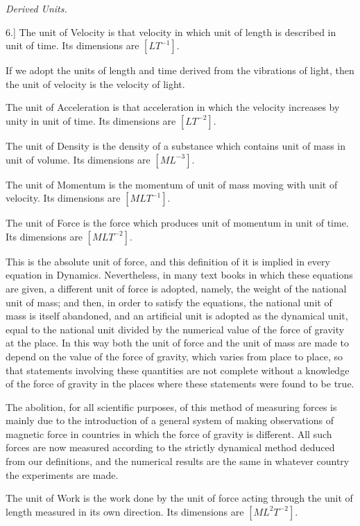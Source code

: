 \documentclass[11pt,a4paper]{article}
\begin{document}
\clearpage

\begin{center}
\textit{Derived Units.}
\end{center}

6.] The unit of Velocity is that velocity in which unit of length is
described in unit of time. Its dimensions are \([LT^{-1}]\).

If we adopt the units of length and time derived from the vibrations of
light, then the unit of velocity is the velocity of light.

The unit of Acceleration is that acceleration in which the velocity
increases by unity in unit of time. Its dimensions are \([LT^{-2}]\).

The unit of Density is the density of a substance which contains unit of
mass in unit of volume. Its dimensions are \([ML^{-3}]\).

The unit of Momentum is the momentum of unit of mass moving with unit of
velocity. Its dimensions are \([MLT^{-1}]\).

The unit of Force is the force which produces unit of momentum in unit of
time. Its dimensions are \([MLT^{-2}]\).

This is the absolute unit of force, and this definition of it is implied
in every equation in Dynamics. Nevertheless, in many text books in which
these equations are given, a different unit of force is adopted, namely,
the weight of the national unit of mass; and then, in order to satisfy
the equations, the national unit of mass is itself abandoned, and an
artificial unit is adopted as the dynamical unit, equal to the national
unit divided by the numerical value of the force of gravity at the place.
In this way both the unit of force and the unit of mass are made to
depend on the value of the force of gravity, which varies from place to
place, so that statements involving these quantities are not complete
without a knowledge of the force of gravity in the places where these
statements were found to be true.

The abolition, for all scientific purposes, of this method of measuring
forces is mainly due to the introduction of a general system of making
observations of magnetic force in countries in which the force of gravity
is different. All such forces are now measured according to the strictly
dynamical method deduced from our definitions, and the numerical results
are the same in whatever country the experiments are made.

The unit of Work is the work done by the unit of force acting through the
unit of length measured in its own direction. Its dimensions are
\([ML^2T^{-2}]\).
\end{document}
